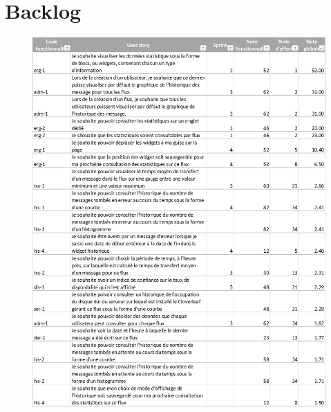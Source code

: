 \tocless\chapter{Backlog}
	\begin{figure}[H]
		\centering
		\includegraphics[width=17cm]{../img/annexes/backlog_1.png}
	\end{figure}
